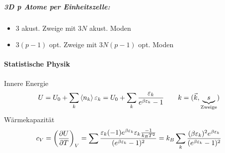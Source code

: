 \subparagraph{3D p Atome per Einheitszelle:}
\begin{itemize}
    \item $3$ akust. Zweige mit $3N$ akust. Moden
    \item $3(p-1)$ opt. Zweige mit $3N(p-1)$ opt. Moden
\end{itemize}

\paragraph{Statistische Physik}

Innere Energie
\begin{align}
    U=U_0+ \sum_k \expval{n_k} \varepsilon_k = U_0 + \sum_k \frac{\varepsilon_k}{e^{\beta \varepsilon_k}-1} \qquad k=(\Vec{k},\underbrace{s}_{\text{Zweige}})
\end{align}
Wärmekapazität
\begin{align}
    c_V=\left( \pdv{U}{T}\right)_V = \sum \frac{\varepsilon_k (-1) e^{\beta\varepsilon_k}\varepsilon_k \frac{-1}{k_BT^2}}{(e^{\beta \varepsilon_k}-1)^2} = k_B \sum_k \frac{(\beta\varepsilon_k)^2e^{\beta \varepsilon_k}}{(e^{\beta \varepsilon_k}-1)^2}
\end{align}
